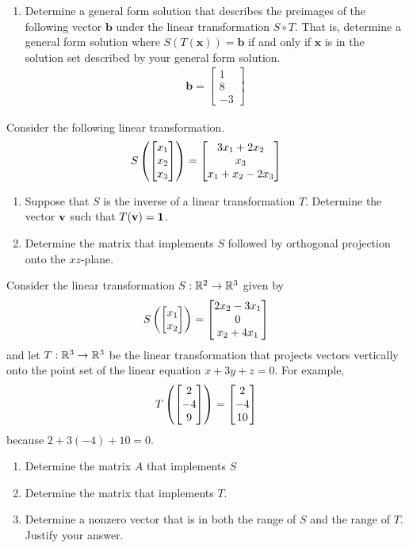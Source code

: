 \begin{tasks}[resume, style=enumerate]
\begin{enumerate}[label=(\alph*)]
    transformation $\mathbf x \mapsto S(T(\mathbf x))$ is equivalent
    to the transformation $\mathbf x \mapsto A \mathbf x$.
  \item
    Determine a general form solution that describes the preimages of
    the following vector $\mathbf b$ under the linear transformation
    $S \circ T$.  That is, determine a general form solution where
    $S(T(\mathbf x)) = \mathbf b$ if and only if $\mathbf x$ is in the
    solution set described by your general form solution.
    \begin{align*}
      \mathbf b =
      \begin{bmatrix}
        1 \\ 8 \\ -3
      \end{bmatrix}
    \end{align*}
  \end{enumerate}
\task
  Consider the following linear transformation.
  \begin{displaymath}
    S \left(  \begin{bmatrix} x_1 \\ x_2 \\ x_3 \end{bmatrix}  \right)
    =
    \begin{bmatrix}
      3 x_1 + 2 x_2 \\ x_3 \\ x_1 + x_2 - 2 x_3
    \end{bmatrix}
  \end{displaymath}
  \begin{enumerate}[label=(\alph*)]
  \item
    Suppose that $S$ is the inverse of a linear transformation $T$.
    Determine the vector $\mathbf v$ such that $T(\mathbf v) = \mathbf 1$.
  \item
    Determine the matrix that implements $S$ followed by orthogonal
    projection onto the $xz$-plane.
  \end{enumerate}
\task
  Consider the linear transformation $S : \mathbb R^2 \to \mathbb R^3$ given by
  \begin{displaymath}
    S \left(  \begin{bmatrix} x_1 \\ x_2 \end{bmatrix}  \right)
    = \begin{bmatrix} 2x_2 - 3x_1 \\ 0 \\ x_2 + 4x_1 \end{bmatrix}
  \end{displaymath}
  and let $T : \mathbb R^3 \to \mathbb R^3$ be the linear transformation that
  projects vectors vertically onto the point set of the linear
  equation $x + 3y + z = 0$.  For example,
  \begin{displaymath}
    T\left(  \begin{bmatrix} 2 \\ -4 \\ 9 \end{bmatrix}  \right) =  \begin{bmatrix} 2 \\ -4 \\ 10 \end{bmatrix} 
  \end{displaymath}
  because $2 + 3(-4) + 10 = 0$.
  \begin{enumerate}[label=(\alph*)]
  \item
    Determine the matrix $A$ that implements $S$
  \item
    Determine the matrix that implements $T$.
  \item
    Determine a nonzero vector that is in both the range of $S$ and
    the range of $T$.  Justify your answer.
  \end{enumerate}
\end{tasks}

